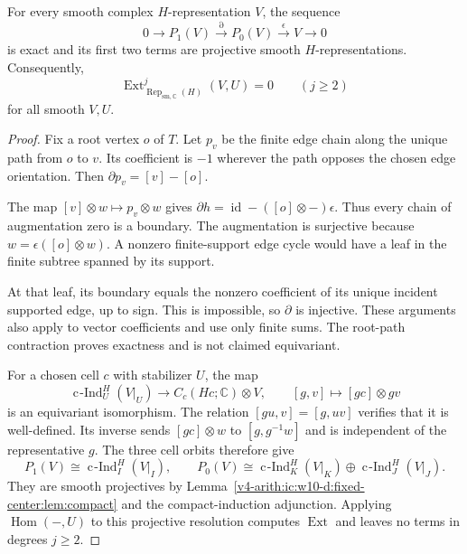 \begin{theorem}\label{v4-arith:ic:w10-d:fixed-center:thm:resolution}
For every smooth complex $H$-representation $V$, the sequence
\begin{equation}\label{v4-arith:ic:w10-d:fixed-center:eq:resolution}
 0\longrightarrow P_1(V)\xrightarrow{\partial}P_0(V)
 \xrightarrow{\epsilon}V\longrightarrow0
\end{equation}
is exact and its first two terms are projective smooth $H$-representations.
Consequently,
\[
 \operatorname{Ext}^j_{\operatorname{Rep}_{\mathrm{sm},\mathbb C}(H)}(V,U)=0
 \qquad(j\ge2)
\]
for all smooth $V,U$.
\end{theorem}
\begin{proof}
Fix a root vertex $o$ of $T$.
Let $p_v$ be the finite edge chain along the unique path from $o$ to $v$.
Its coefficient is $-1$ wherever the path opposes the chosen edge orientation.
Then $\partial p_v=[v]-[o]$.

The map $[v]\otimes w\mapsto p_v\otimes w$ gives
$\partial h=\operatorname{id}-([o]\otimes-)\epsilon$.
Thus every chain of augmentation zero is a boundary.
The augmentation is surjective because $w=\epsilon([o]\otimes w)$.
A nonzero finite-support edge cycle would have a leaf in the finite subtree spanned by its support.

At that leaf, its boundary equals the nonzero coefficient of its unique incident supported edge, up to sign.
This is impossible, so $\partial$ is injective.
These arguments also apply to vector coefficients and use only finite sums.
The root-path contraction proves exactness and is not claimed equivariant.

For a chosen cell $c$ with stabilizer $U$, the map
\[
 \operatorname{c\!\operatorname{-}Ind}_U^H(V|_U)\longrightarrow C_c(Hc;\mathbb C)\otimes V,
 \qquad [g,v]\longmapsto[gc]\otimes gv
\]
is an equivariant isomorphism.
The relation $[gu,v]=[g,uv]$ verifies that it is well-defined.
Its inverse sends $[gc]\otimes w$ to $[g,g^{-1}w]$ and is independent of the representative $g$.
The three cell orbits therefore give
\[
 P_1(V)\cong\operatorname{c\!\operatorname{-}Ind}_I^H(V|_I),\qquad
 P_0(V)\cong\operatorname{c\!\operatorname{-}Ind}_K^H(V|_K)\oplus\operatorname{c\!\operatorname{-}Ind}_J^H(V|_J).
\]
They are smooth projectives by Lemma~\ref{v4-arith:ic:w10-d:fixed-center:lem:compact} and the compact-induction adjunction.
Applying $\operatorname{Hom}(-,U)$ to this projective resolution computes $\operatorname{Ext}$ and leaves no terms in degrees $j\ge2$.
\end{proof}

